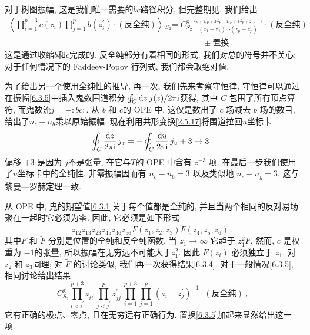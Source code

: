对于树图振幅, 这是我们唯一需要的$b c$路径积分, 但完整期见, 我们给出
\begin{align}
\left\langle\prod_{i=1}^{p+3} c(z_{i}) \prod_{j=1}^{p} b(z_{j}^{\prime}) \cdot(\text{反全纯})\right\rangle\bigg._{\!\!S_{2}}
&=C_{S_{2}}^{\mathrm{g}} \frac{z_{p+1, p+2} z_{p+1, p+3} z_{p+2, p+3}}{(z_{1}-z_{1}^{\prime}) \cdots(z_{p}-z_{p}^{\prime})} \cdot(\text {反全纯})  \nonumber \\
&\qquad \qquad \pm \text {置换} \:, \label{6.3.5}
\end{align}
这是通过收缩$b$和$c$完成的. 反全纯部分有着相同的形式. 我们对总的符号并不关心; 对于任何情况下的 Faddeev-Popov 行列式, 我们都会取绝对值.

为了给出另一个使用全纯性的推导, 再一次, 我们先来考察守恒律, 守恒律可以通过在振幅\eqref{6.3.5}中插入鬼数围道积分 $\oint_{C} \mathrm{d} z \: j(z) / 2 \pi \mathrm{i}$获得, 其中 $C$ 包围了所有顶点算符, 而鬼数流$j=-:\mathrel{bc}:$. 从 $b$ 和 $c$的 OPE 中, 这仅是数出了 $c$ 场减去 $b$ 场的数目, 给出了$n_{c}-n_{b}$乘以原始振幅. 
现在利用共形变换\eqref{2.5.17}将围道拉回$u$坐标卡
\begin{equation}
	\oint_{C} \frac{\mathrm{d} z}{2 \pi \mathrm{i}}\, j_{z}=-\oint_{C} \frac{\mathrm{d} u}{2 \pi \mathrm{i}}\, j_{u}+3 \to 3 \:. \label{6.3.6}
\end{equation}
偏移 $+3$ 是因为 $j$不是张量, 在它与$T$的 OPE 中含有 $z^{-3}$ 项. 在最后一步我们使用了$u$坐标卡中的全纯性. 
非零振幅因而有 $n_{c}-n_{b}=3$ 以及类似地 $n_{\tilde{c}}-n_{\tilde{b}}=3$, 这与黎曼—罗赫定理一致.


从 OPE 中, 鬼的期望值\eqref{6.3.1}关于每个值都是全纯的, 并且当两个相同的反对易场聚在一起时它必须为零. 因此, 它必须是如下形式
\begin{equation}
	z_{12} z_{13} z_{23} \bar{z}_{45} \bar{z}_{46} \bar{z}_{56} F(z_{1}, z_{2}, z_{3}) 
	\tilde{F}(\bar{z}_{4}, \bar{z}_{5}, \bar{z}_{6}) \:, \label{6.3.7}
\end{equation}
其中$F$ 和 $\tilde{F}$ 分别是位置的全纯和反全纯函数. 当 $z_{1} \rightarrow \infty$ 它趋于 $z_{1}^{2} F$. 
然而, $c$ 是权重为 $-1$的张量, 所以振幅在无穷远不可能大于$z_{1}^{2}$. 因此 $F(z_{i})$ 必须独立于 $z_{1}$, 对 $z_{2}$ 和 $z_{3}$同理; 
对 $\tilde{F}$ 的讨论类似, 我们再一次获得结果\eqref{6.3.4}. 对于一般情况\eqref{6.3.5}, 相同讨论给出结果
\begin{equation}
	C_{S_{2}}^{\mathrm{g}} \prod_{i<i^{\prime}}^{p+3} z_{i i^{\prime}} \prod_{j<j^{\prime}}^{p} z_{j j^{\prime}}^{\prime} 
	\prod_{i=1}^{p+3} \prod_{j=1}^{p}(z_{i}-z_{j}^{\prime})^{-1} \cdot(\text {反全纯}) \:, \label{6.3.8}
\end{equation}
它有正确的极点、零点, 且在无穷远有正确行为. 置换\eqref{6.3.5}加起来显然给出这一项. 

